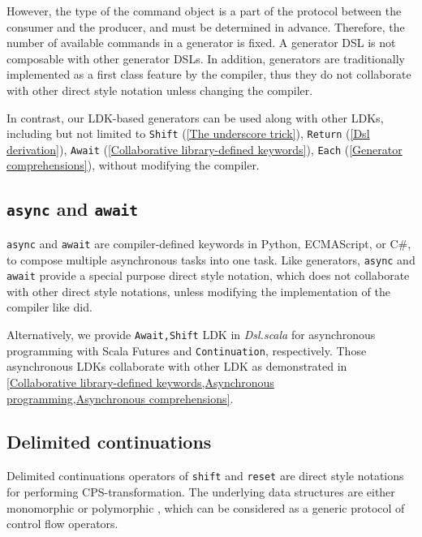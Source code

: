 However, the type of the command object is a part of the protocol between the consumer and the producer, and must be determined in advance. Therefore, the number of available commands in a generator is fixed. A generator DSL is not composable with other generator DSLs. In addition, generators are traditionally implemented as a first class feature by the compiler, thus they do not collaborate with other direct style notation unless changing the compiler.

In contrast, our LDK-based generators can be used along with other LDKs, including but not limited to \lstinline{Shift} (\cref{The underscore trick}), \lstinline{Return} (\cref{Dsl derivation}), \lstinline{Await} (\cref{Collaborative library-defined keywords}), \lstinline{Each} (\cref{Generator comprehensions}), without modifying the compiler.

\subsection{\lstinline{async} and \lstinline{await}}

\lstinline{async} and \lstinline{await} are compiler-defined keywords in Python, ECMAScript, or C\#, to compose multiple asynchronous tasks into one task. Like generators, \lstinline{async} and \lstinline{await} provide a special purpose direct style notation, which does not collaborate with other direct style notations, unless modifying the implementation of the compiler like \cite{pep525} did.

Alternatively, we provide \lstinline{Await,Shift} LDK in \textit{Dsl.scala} for asynchronous programming with Scala Futures and \lstinline{Continuation}, respectively. Those asynchronous LDKs collaborate with other LDK as demonstrated in \cref{Collaborative library-defined keywords,Asynchronous programming,Asynchronous comprehensions}.

\subsection{Delimited continuations}

Delimited continuations operators of \lstinline{shift} and \lstinline{reset} \cite{Danvy1990AbstractingC} are direct style notations for performing CPS-transformation. The underlying data structures are either monomorphic \cite{danvy1989functional} or polymorphic \cite{asai2007polymorphic}, which can be considered as a generic protocol of control flow operators.

